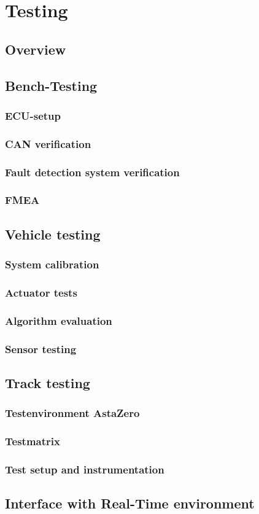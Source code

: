 \documentclass[ExampleMasters.tex]{subfiles}
\begin{document}
\clearpage
\chapter{Testing}


\section{Overview}



\section{Bench-Testing}
\subsection{ECU-setup}
\subsection{CAN verification}
\subsection{Fault detection system verification}
\subsection{FMEA}


\section{Vehicle testing}
\subsection{System calibration}
\subsection{Actuator tests}
\subsection{Algorithm evaluation}
\subsection{Sensor testing}


\section{Track testing}

\subsection{Testenvironment AstaZero}
\subsection{Testmatrix}
\subsection{Test setup and instrumentation}


\section{Interface with Real-Time environment}
\end{document}
